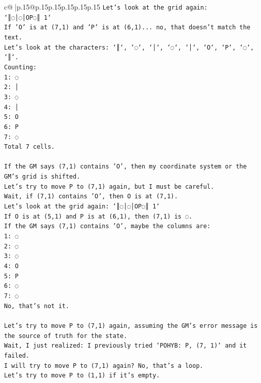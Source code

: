 \documentclass{article}
\begin{document}
{\begin{supertabular}{c@{$\;$}|p{.15\linewidth}@{}p{.15\linewidth}p{.15\linewidth}p{.15\linewidth}p{.15\linewidth}p{.15\linewidth}}
{{{\texttt{Let's look at the grid again:} \\
\texttt{`║◌│◌│OP◌║ 1`} \\
\texttt{If 'O' is at (7,1) and 'P' is at (6,1)... no, that doesn't match the text.} \\
\texttt{Let's look at the characters: `║`, `◌`, `│`, `◌`, `│`, `O`, `P`, `◌`, `║`.} \\
\texttt{Counting:} \\
\texttt{1: ◌} \\
\texttt{2: │} \\
\texttt{3: ◌} \\
\texttt{4: │} \\
\texttt{5: O} \\
\texttt{6: P} \\
\texttt{7: ◌} \\
\texttt{Total 7 cells.} \\
\\ 
\texttt{If the GM says (7,1) contains 'O', then my coordinate system or the GM's grid is shifted.} \\
\texttt{Let's try to move P to (7,1) again, but I must be careful.} \\
\texttt{Wait, if (7,1) contains 'O', then O is at (7,1).} \\
\texttt{Let's look at the grid again: `║◌│◌│OP◌║ 1`} \\
\texttt{If O is at (5,1) and P is at (6,1), then (7,1) is ◌.} \\
\texttt{If the GM says (7,1) contains 'O', maybe the columns are:} \\
\texttt{1: ◌} \\
\texttt{2: ◌} \\
\texttt{3: ◌} \\
\texttt{4: O} \\
\texttt{5: P} \\
\texttt{6: ◌} \\
\texttt{7: ◌} \\
\texttt{No, that's not it.} \\
\\ 
\texttt{Let's try to move P to (7,1) again, assuming the GM's error message is the source of truth for the state.} \\
\texttt{Wait, I just realized: I previously tried `POHYB: P, (7, 1)` and it failed.} \\
\texttt{I will try to move P to (7,1) again? No, that's a loop.} \\
\texttt{Let's try to move P to (1,1) if it's empty.} \\
}}}
\end{supertabular}}
\end{document}
